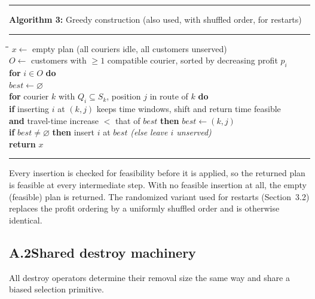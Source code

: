\documentclass[10pt, a4paper]{article}
\begin{document}
\begin{center}
\begin{minipage}{0.92\linewidth}
\small
\hrule\vspace{2pt}
\textbf{Algorithm 3:} Greedy construction (also used, with shuffled order,
for restarts)
\vspace{2pt}\hrule\vspace{4pt}
\begin{tabbing}
\hspace{1.2em}\=\hspace{1.2em}\=\hspace{1.2em}\=\kill
$x \leftarrow$ empty plan (all couriers idle, all customers unserved)\\
$O \leftarrow$ customers with $\ge 1$ compatible courier, sorted by
decreasing profit $p_i$\\
\textbf{for} $i \in O$ \textbf{do}\\
\>$best \leftarrow \varnothing$\\
\>\textbf{for} courier $k$ with $Q_i \subseteq S_k$,
  position $j$ in route of $k$ \textbf{do}\\
\>\>\textbf{if} inserting $i$ at $(k, j)$ keeps time windows, shift and
  return time feasible\\
\>\>\textbf{and} travel-time increase $<$ that of $best$
  \textbf{then} $best \leftarrow (k, j)$\\
\>\textbf{if} $best \neq \varnothing$ \textbf{then} insert $i$ at $best$
  \quad\emph{(else leave $i$ unserved)}\\
\textbf{return} $x$
\end{tabbing}
\vspace{2pt}\hrule
\end{minipage}
\end{center}

Every insertion is checked for feasibility before it is applied, so the
returned plan is feasible at every intermediate step. With no feasible
insertion at all, the empty (feasible) plan is returned. The randomized
variant used for restarts (Section~3.2) replaces the profit ordering by a
uniformly shuffled order and is otherwise identical.

\subsection*{A.2\quad Shared destroy machinery}

All destroy operators determine their removal size the same way and share
a biased selection primitive.
\end{document}

